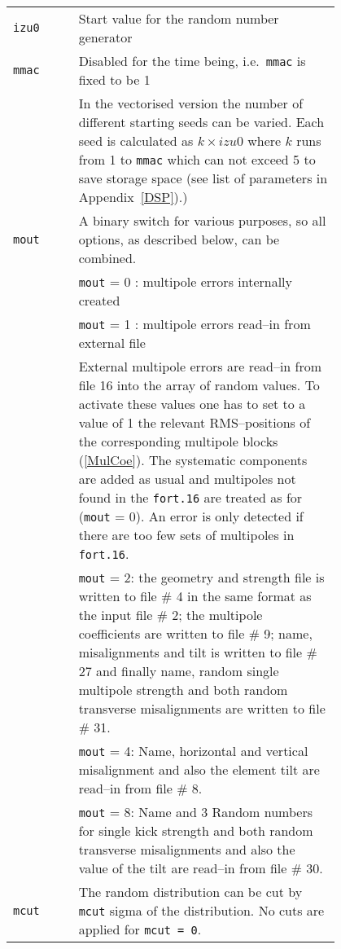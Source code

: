 \bigskip
\begin{tabular}{@{}lp{0.8\linewidth}}
    \texttt{izu0} & Start value for the random number generator \\
    \texttt{mmac} & {\color{notered} Disabled for the time being, i.e.\  \texttt{mmac} is fixed to be 1} \\
                  & In the vectorised version the number of different starting seeds can be varied. Each seed is calculated as \mbox{$ k \times izu0 $} where $k$ runs from 1 to \texttt{mmac} which can not exceed 5 to save storage space (see    list of parameters in Appendix~\ref{DSP}).) \\
    \texttt{mout} & A binary switch for various purposes, so all options, as described below, can be combined. \\
                  & \texttt{mout} = 0 : multipole errors internally created \\
                  & \texttt{mout} = 1 : multipole errors read--in from external file \\
                  & External multipole errors are read--in from file 16 into the array of random values. To activate these values one has to set to a value of 1 the relevant RMS--positions of the corresponding multipole blocks (\ref{MulCoe}). The systematic components are added as usual and multipoles not found in the \texttt{fort.16} are treated as for (\texttt{mout} = 0). An error is only detected if there are too few sets of multipoles in \texttt{fort.16}. \\
                  & \texttt{mout} = 2: the geometry and strength file is written to file \# 4 in the same format as the input file \# 2; the multipole coefficients are written to file \# 9; name, misalignments and tilt is written to file \# 27 and finally name, random single multipole  strength and both random transverse misalignments are written to  file \# 31.\\
                  & \texttt{mout} = 4: Name, horizontal and vertical misalignment and also the element tilt are read--in from file \# 8.\\
                  & \texttt{mout} = 8: Name and 3 Random numbers for single kick strength and both random transverse misalignments and also the value of the tilt are read--in from file \# 30. \\
    \texttt{mcut} & The random distribution can be cut by \texttt{mcut} sigma of the distribution. No cuts are applied for \texttt{mcut = 0}.
\end{tabular}

